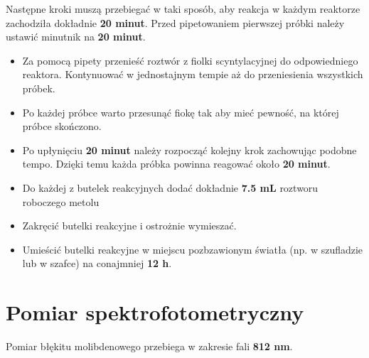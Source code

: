 \documentclass[
  letterpaper,
  DIV=11,
  numbers=noendperiod]{scrreprt}
\providecommand{\tightlist}{%
  \setlength{\itemsep}{0pt}\setlength{\parskip}{0pt}}\usepackage{longtable,booktabs,array}
\begin{document}
\begin{tcolorbox}[enhanced jigsaw, toptitle=1mm, bottomtitle=1mm, opacitybacktitle=0.6, colframe=quarto-callout-important-color-frame, bottomrule=.15mm, title=\textcolor{quarto-callout-important-color}{\faExclamation}\hspace{0.5em}{Uwaga}, colbacktitle=quarto-callout-important-color!10!white, left=2mm, breakable, rightrule=.15mm, colback=white, opacityback=0, arc=.35mm, coltitle=black, leftrule=.75mm, toprule=.15mm, titlerule=0mm]

Następne kroki muszą przebiegać w taki sposób, aby reakcja w każdym
reaktorze zachodziła dokładnie \textbf{20 minut}. Przed pipetowaniem
pierwszej próbki należy ustawić minutnik na \textbf{20 minut}.

\end{tcolorbox}

\begin{itemize}
\tightlist
\item
  Za pomocą pipety przenieść roztwór z fiolki scyntylacyjnej do
  odpowiedniego reaktora. Kontynuować w jednostajnym tempie aż do
  przeniesienia wszystkich próbek.
\item
  Po każdej próbce warto przesunąć fiokę tak aby mieć pewność, na której
  próbce skończono.
\item
  Po upłynięciu \textbf{20 minut} należy rozpocząć kolejny krok
  zachowując podobne tempo. Dzięki temu każda próbka powinna reagować
  około \textbf{20 minut}.
\item
  Do każdej z butelek reakcyjnych dodać dokładnie \textbf{7.5 mL}
  roztworu roboczego metolu
\item
  Zakręcić butelki reakcyjne i ostrożnie wymieszać.
\item
  Umieścić butelki reakcyjne w miejscu pozbzawionym światła (np. w
  szufladzie lub w szafce) na conajmniej \textbf{12 h}.
\end{itemize}

\hypertarget{pomiar-spektrofotometryczny}{%
\section{Pomiar
spektrofotometryczny}\label{pomiar-spektrofotometryczny}}

Pomiar błękitu molibdenowego przebiega w zakresie fali \textbf{812 nm}.
\end{document}
